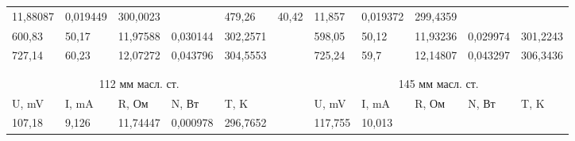 \documentclass[12pt,a4paper]{article}
\begin{document}
\begin{enumerate}
{\begin{table}[p]
{\begin{tabular}{lllllllllll}
							\multicolumn{1}{l|}{11,88087} &
							\multicolumn{1}{l|}{0,019449} &
							\multicolumn{1}{l|}{300,0023} &
							\multicolumn{1}{l|}{} &
							\multicolumn{1}{l|}{479,26} &
							\multicolumn{1}{l|}{40,42} &
							\multicolumn{1}{l|}{11,857} &
							\multicolumn{1}{l|}{0,019372} &
							\multicolumn{1}{l|}{299,4359} \\ \cline{1-5} \cline{7-11} 
							\multicolumn{1}{|l|}{600,83} &
							\multicolumn{1}{l|}{50,17} &
							\multicolumn{1}{l|}{11,97588} &
							\multicolumn{1}{l|}{0,030144} &
							\multicolumn{1}{l|}{302,2571} &
							\multicolumn{1}{l|}{} &
							\multicolumn{1}{l|}{598,05} &
							\multicolumn{1}{l|}{50,12} &
							\multicolumn{1}{l|}{11,93236} &
							\multicolumn{1}{l|}{0,029974} &
							\multicolumn{1}{l|}{301,2243} \\ \cline{1-5} \cline{7-11} 
							\multicolumn{1}{|l|}{727,14} &
							\multicolumn{1}{l|}{60,23} &
							\multicolumn{1}{l|}{12,07272} &
							\multicolumn{1}{l|}{0,043796} &
							\multicolumn{1}{l|}{304,5553} &
							\multicolumn{1}{l|}{} &
							\multicolumn{1}{l|}{725,24} &
							\multicolumn{1}{l|}{59,7} &
							\multicolumn{1}{l|}{12,14807} &
							\multicolumn{1}{l|}{0,043297} &
							\multicolumn{1}{l|}{306,3436} \\ \cline{1-5} \cline{7-11} 
							&
							&
							&
							&
							&
							&
							&
							&
							&
							&
							\\
							&
							&
							&
							&
							&
							&
							&
							&
							&
							&
							\\ \cline{1-5} \cline{7-11} 
							\multicolumn{5}{|c|}{112 мм масл. ст.} &
							\multicolumn{1}{l|}{} &
							\multicolumn{5}{c|}{145 мм масл. ст.} \\ \cline{1-5} \cline{7-11} 
							\multicolumn{1}{|l|}{U, mV} &
							\multicolumn{1}{l|}{I, mA} &
							\multicolumn{1}{l|}{R, Ом} &
							\multicolumn{1}{l|}{N, Вт} &
							\multicolumn{1}{l|}{T, K} &
							\multicolumn{1}{l|}{} &
							\multicolumn{1}{l|}{U, mV} &
							\multicolumn{1}{l|}{I, mA} &
							\multicolumn{1}{l|}{R, Ом} &
							\multicolumn{1}{l|}{N, Вт} &
							\multicolumn{1}{l|}{T, K} \\ \cline{1-5} \cline{7-11} 
							\multicolumn{1}{|l|}{107,18} &
							\multicolumn{1}{l|}{9,126} &
							\multicolumn{1}{l|}{11,74447} &
							\multicolumn{1}{l|}{0,000978} &
							\multicolumn{1}{l|}{296,7652} &
							\multicolumn{1}{l|}{} &
							\multicolumn{1}{l|}{117,755} &
							\multicolumn{1}{l|}{10,013} &

\end{tabular}}
\end{table}}
\end{enumerate}
\end{document}
